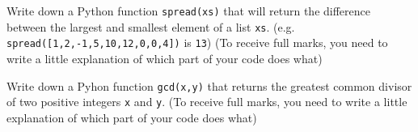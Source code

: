\documentclass[addpoints,12pt]{exam}
\newcommand{\code}[1]{{\texttt{#1}}}
\begin{document}
\begin{questions}
\begin{enumerate}
\end{enumerate}


\newpage
\question[20] Write down a Python function \code{spread(xs)} that will return the difference between the largest and smallest element of a list \code{xs}. (e.g. \code{spread([1,2,-1,5,10,12,0,0,4])} is \code{13}) (To receive full marks, you need to write a little explanation of which part of your code does what)


\newpage
\question[20] Write down a Pyhon function \code{gcd(x,y)} that returns the greatest common divisor of two positive integers \code{x} and \code{y}. (To receive full marks, you need to write a little explanation of which part of your code does what) 
\end{questions}
\end{document}
